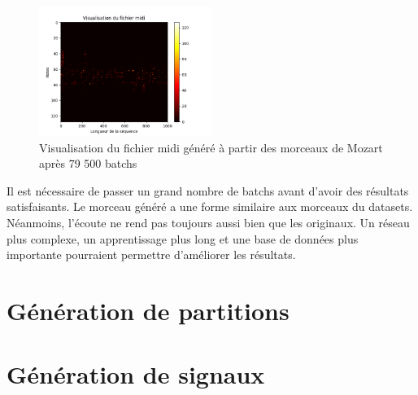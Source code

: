 \begin{figure}[!h]
  \centering
  \includegraphics[width=0.5\textwidth]{images/chapter9/midi_generated_mozart_79500.png}
  \caption{Visualisation du fichier midi généré à partir des morceaux de Mozart après 79 500 batchs}
  \label{midi_generated_mozart}
\end{figure}

Il est nécessaire de passer un grand nombre de batchs avant d'avoir des résultats satisfaisants. Le morceau généré a une forme similaire aux morceaux du datasets. Néanmoins, l'écoute ne rend pas toujours aussi bien que les originaux. Un réseau plus complexe, un apprentissage plus long et une base de données plus importante pourraient permettre d'améliorer les résultats.


\section{Génération de partitions}


\section{Génération de signaux}